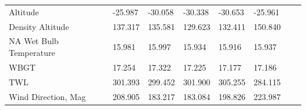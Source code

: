 \documentclass[a4paper,12pt]{article} %
\begin{document}
\begin{enumerate}
\begin{table}[H]
\begin{tabular}{llllllll}
Altitude             &-25.987          &-30.058                 &-30.338             &-30.653            & -25.961 \\
Density Altitude             &137.317          &135.581                 &129.623             &132.411            & 150.840 \\
NA Wet Bulb Temperature             &15.981          &15.997                 &15.934             &15.916            & 15.937 \\
WBGT             &17.254          &17.322                     &17.225             &17.177            & 17.186 \\
TWL             &301.393        &299.452                     &301.900             &305.255            & 284.115 \\
Wind Direction, Mag                 & 208.905               & 183.217               & 183.084             & 198.826            & 223.987 

\end{tabular}
\label{mean-table}
\end{table}


\end{enumerate}
\end{document}
